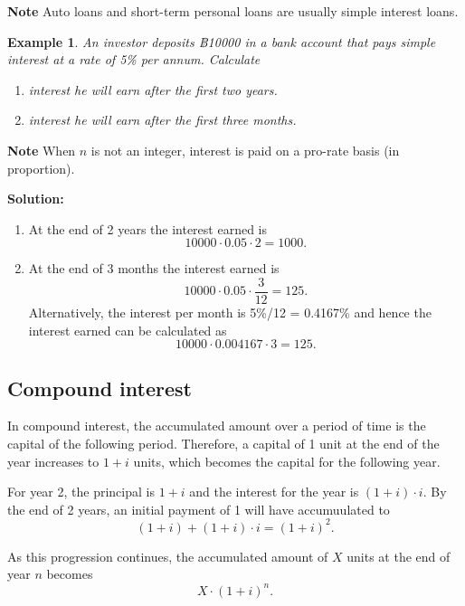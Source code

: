 \documentclass[
]{book}
\theoremstyle{definition}
\theoremstyle{definition}
\newtheorem{example}{Example}[chapter]
\theoremstyle{definition}
\theoremstyle{definition}
\theoremstyle{remark}
\begin{document}
\textbf{Note} Auto loans and short-term personal loans are usually simple
interest loans.

\begin{example}

\emph{An investor deposits ฿10000 in a bank account that pays simple interest
at a rate of 5\% per annum. Calculate}

\begin{enumerate}
\def\labelenumi{\arabic{enumi}.}
\item
  \emph{interest he will earn after the first two years.}
\item
  \emph{interest he will earn after the first three months.}
\end{enumerate}

\end{example}

\textbf{Note} When \(n\) is not an integer, interest is paid on a pro-rate
basis (in proportion).

\textbf{Solution:}

\begin{enumerate}
\def\labelenumi{\arabic{enumi}.}
\item
  At the end of 2 years the interest earned is
  \[10000 \cdot 0.05 \cdot 2 = 1000.\]
\item
  At the end of 3 months the interest earned is
  \[10000 \cdot 0.05 \cdot \frac{3}{12} = 125.\] Alternatively, the
  interest per month is 5\%/12 = 0.4167\% and hence the interest earned
  can be calculated as \[10000 \cdot 0.004167 \cdot 3 = 125.\]
\end{enumerate}

\hypertarget{compound-interest}{%
\subsection{Compound interest}\label{compound-interest}}

In compound interest, the accumulated amount over a period of time is the capital of the following period. Therefore, a capital of 1 unit at the end of the year increases to \(1 + i\) units, which becomes the capital for the following year.

For year 2, the principal is \(1 + i\) and the interest for the year is
\(( 1 + i ) \cdot i\). By the end of 2 years, an initial payment of 1 will have accumuulated to
\[ (1+i) + ( 1 + i ) \cdot i = (1+i)^2.\]

As this progression continues, the accumulated amount of \(X\) units at the end of year \(n\) becomes
\[ X\cdot(1 + i)^n. \]
\end{document}
